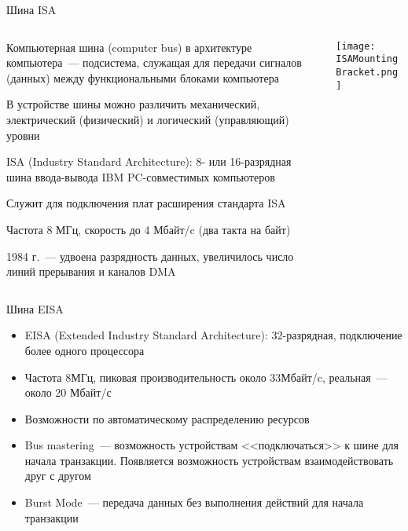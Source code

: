 \documentclass[aspectratio=169,14pt]{beamer}
\begin{document}
\begin{frame}{Шина ISA}
    \begin{columns}
        \begin{column}{0.75\textwidth}
            \begin{itemize}
                \begin{footnotesize}
                    \item Компьютерная шина (computer bus) в архитектуре компьютера~---
                    подсистема, служащая для передачи сигналов (данных) между функциональными
                    блоками компьютера
                    \item В устройстве шины можно различить механический,
                    электрический (физический) и логический (управляющий) уровни
                    \item ISA (Industry Standard Architecture): 8- или 16-разрядная
                    шина ввода-вывода IBM PC-совместимых компьютеров
                    \item Служит для подключения плат расширения стандарта ISA
                    \item Частота 8 МГц, скорость до 4 Мбайт/c (два такта на байт)
                    \item 1984 г.~--- удвоена разрядность данных, увеличилось число
                    линий прерывания и каналов DMA
                \end{footnotesize}
            \end{itemize}
        \end{column}
        \begin{column}{0.25\textwidth}
            \texttt{[image: ISAMountingBracket.png]}
        \end{column}
    \end{columns}
\end{frame}

\begin{frame}{Шина EISA}
    \begin{itemize}
        \item EISA (Extended Industry Standard Architecture): 32-разрядная,
        подключение более одного процессора
        \item Частота 8МГц, пиковая производительность около 33Мбайт/c,
        реальная~--- около 20 Мбайт/с
        \item Возможности по автоматическому распределению ресурсов
        \item Bus mastering~--- возможность устройствам <<подключаться>>
        к шине для начала транзакции. Появляется возможность устройствам
        взаимодействовать друг с другом
        \item Burst Mode~--- передача данных без выполнения действий
        для начала транзакции
    \end{itemize}
\end{frame}
\end{document}
